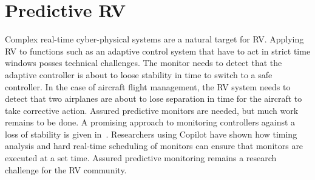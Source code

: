 \section{Predictive RV} \label{sec:predictive}

\noindent{}

Complex  real-time cyber-physical systems  are a natural target for
RV.  Applying RV to  functions such as an  adaptive control system
that have to act in strict time windows posses  technical
challenges. The monitor needs to detect  that the adaptive
controller is about to loose stability in time to  switch to a safe
controller. In the case of aircraft flight management, the RV system
needs to detect that  two airplanes are about to lose separation in
time for the aircraft to take corrective action.   Assured predictive
monitors are needed, but much work remains to be done. A promising
approach to monitoring controllers against a loss of stability is
given in~\cite{}. Researchers using Copilot have shown how  timing
analysis and  hard real-time scheduling of monitors can ensure that
monitors are executed at a set time.  Assured predictive monitoring
remains a research challenge for the RV community. 




